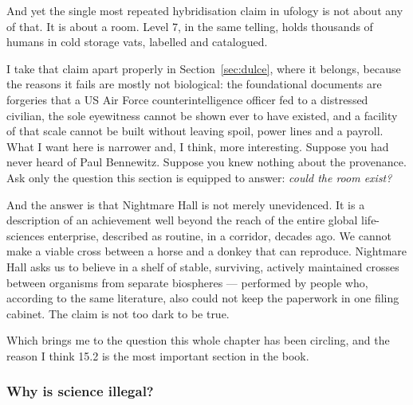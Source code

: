 And yet the single most repeated hybridisation claim in ufology is not about any of that. It is
about a room.  Level 7, in the same telling, holds thousands of humans
in cold storage vats, labelled and catalogued.

I take that claim apart properly in Section~\ref{sec:dulce}, where it belongs, because the reasons
it fails are mostly not biological: the foundational documents are forgeries that a US Air Force
counterintelligence officer fed to a distressed civilian, the sole eyewitness cannot be shown ever
to have existed, and a facility of that scale cannot be built without leaving spoil, power lines
and a payroll. What I want here is narrower and, I think, more interesting. Suppose you had never
heard of Paul Bennewitz. Suppose you knew nothing about the provenance. Ask only the question this
section is equipped to answer: \emph{could the room exist?}

And the answer is that Nightmare Hall is not merely unevidenced. It is a description of an
achievement well beyond the reach of the entire global life-sciences enterprise, described as
routine, in a corridor, decades ago. We cannot make a viable cross between a horse and a donkey
that can reproduce. Nightmare Hall asks us to believe in a shelf of stable, surviving, actively
maintained crosses between organisms from separate biospheres --- performed by people who,
according to the same literature, also could not keep the paperwork in one filing cabinet. The
claim is not too dark to be true. 

Which brings me to the question this whole chapter has been circling, and the reason I think 15.2
is the most important section in the book.

\subsubsection*{Why is science illegal?}

